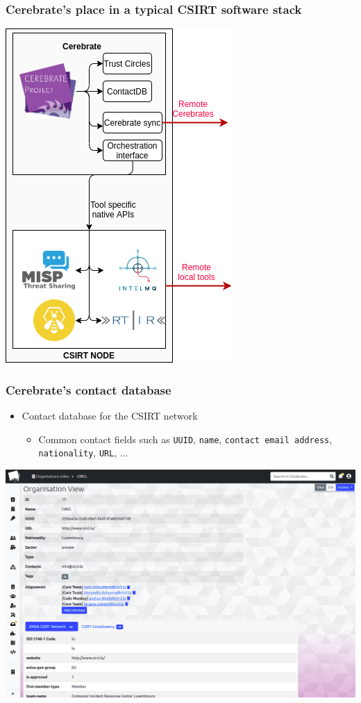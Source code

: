 \begin{frame}
\frametitle{Cerebrate's place in a typical CSIRT software stack}
    \begin{center}
        \includegraphics[width=0.42\linewidth]{pictures/software-stack.png}
    \end{center}
\end{frame}

\begin{frame}
\frametitle{Cerebrate's contact database}
    \begin{itemize}
        \item Contact database for the CSIRT network
        \begin{itemize}
            \item Common contact fields such as \texttt{UUID}, \texttt{name}, \texttt{contact email address}, \texttt{nationality}, \texttt{URL}, ...
        \end{itemize}
    \end{itemize}
    \begin{center}
        \includegraphics[width=0.8\linewidth]{pictures/contact-database-1.png}
    \end{center}
\end{frame}

